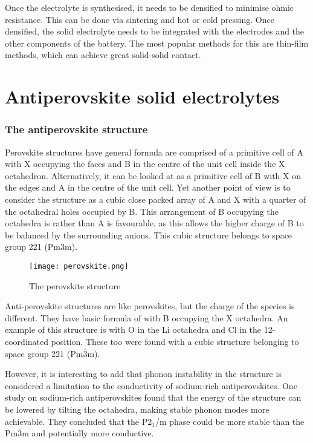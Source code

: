 \documentclass[10pt,a4paper, titlepage]{article}
\begin{document}
Once the electrolyte is synthesised, it needs to be densified to minimise ohmic resistance. 
This can be done via sintering and hot or cold pressing. 
Once densified, the solid electrolyte needs to be integrated with the electrodes and the other components of the battery. 
The most popular methods for this are thin-film methods, which can achieve great solid-solid contact. \cite{RN1}

\part{Antiperovskite solid electrolytes}

\section{The antiperovskite structure}

Perovskite structures have general formula  are comprised of a primitive cell of A with X occupying the faces and B in the centre of the unit cell inside the X octahedron. 
Alternatively, it can be looked at as a primitive cell of B with X on the edges and A in the centre of the unit cell.
Yet another point of view is to consider the structure as a cubic close packed array of A and X with a quarter of the octahedral holes occupied by B.
This arrangement of B occupying the octahedra is rather than A is favourable, as this allows the higher charge of B to be balanced by the surrounding anions. 
This cubic structure belongs to space group 221 (Pm$\overline{3}$m). \cite{RN49} 

\begin{figure}[h]
\centering
\texttt{[image: perovskite.png]}
\caption{\label{perovskite.jpg} The perovskite structure \citep{RN50}}
\end{figure}

Anti-perovskite structures are like perovskites, but the charge of the species is different. 
They have basic formula of  with B occupying the X octahedra. 
An example of this structure is  with O in the Li octahedra and Cl in the 12-coordinated position. 
These too were found with a cubic structure belonging to space group 221 (Pm$\overline{3}$m).

However, it is interesting to add that phonon instability in the structure is considered a limitation to the conductivity of sodium-rich antiperovskites. \cite{RN80}
One study on sodium-rich antiperovskites found that the energy of the structure can be lowered by tilting the  octahedra, making stable phonon modes more achievable. \cite{RN78}
They concluded that the P$2_1$/m phase could be more stable than the Pm$\overline{3}$m and potentially more conductive. 
\end{document}
